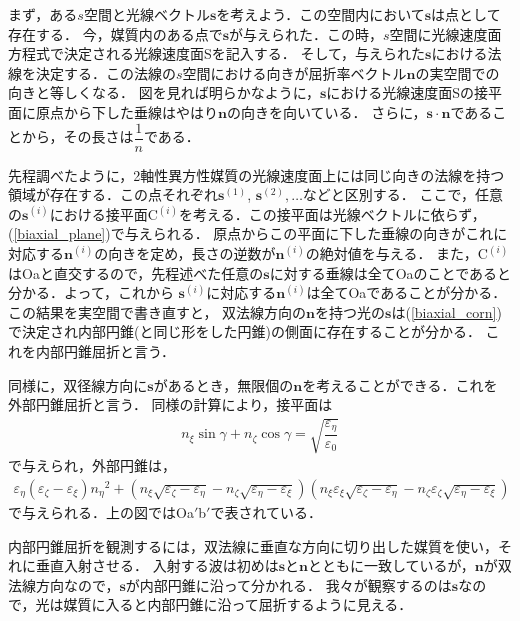 まず，ある$s$空間と光線ベクトル$\boldsymbol{s}$を考えよう．この空間内において$\boldsymbol{s}$は点として存在する．
今，媒質内のある点で$\boldsymbol{s}$が与えられた．この時，$s$空間に光線速度面方程式で決定される光線速度面Sを記入する．
そして，与えられた$\boldsymbol{s}$における法線を決定する．この法線の$s$空間における向きが屈折率ベクトル$\boldsymbol{n}$の実空間での向きと等しくなる．
図を見れば明らかなように，$\boldsymbol{s}$における光線速度面Sの接平面に原点から下した垂線はやはり$\boldsymbol{n}$の向きを向いている．
さらに，$\boldsymbol{s}\cdot\boldsymbol{n}$であることから，その長さは$\dfrac{1}{n}$である．

先程調べたように，2軸性異方性媒質の光線速度面上には同じ向きの法線を持つ領域が存在する．この点それぞれ$\boldsymbol{s}^{(1)}$, $\boldsymbol{s}^{(2)},\ldots$などと区別する．
ここで，任意の$\boldsymbol{s}^{(i)}$における接平面C$^{(i)}$を考える．この接平面は光線ベクトルに依らず，(\ref{biaxial_plane})で与えられる．
原点からこの平面に下した垂線の向きがこれに対応する$\boldsymbol{n}^{(i)}$の向きを定め，長さの逆数が$\boldsymbol{n}^{(i)}$の絶対値を与える．
また，C$^{(i)}$はOaと直交するので，先程述べた任意の$\boldsymbol{s}$に対する垂線は全てOaのことであると分かる．よって，これから
$\boldsymbol{s}^{(i)}$に対応する$\boldsymbol{n}^{(i)}$は全てOaであることが分かる．
この結果を実空間で書き直すと，
双法線方向の$\boldsymbol{n}$を持つ光の$\boldsymbol{s}$は(\ref{biaxial_corn})で決定され内部円錐(と同じ形をした円錐)の側面に存在することが分かる．
これを内部円錐屈折と言う．

同様に，双径線方向に$\boldsymbol{s}$があるとき，無限個の$\boldsymbol{n}$を考えることができる．これを
外部円錐屈折と言う．
同様の計算により，接平面は
\begin{align}
  n_\xi\sin\gamma+n_\zeta\cos\gamma=\sqrt{\dfrac{\varepsilon_\eta}{\varepsilon_0}}
\end{align}
で与えられ，外部円錐は，
\begin{align}
  \varepsilon_\eta(\varepsilon_\zeta-\varepsilon_\xi){n_\eta}^2+\left(n_\xi\sqrt{\varepsilon_\zeta-\varepsilon_\eta}-n_\zeta\sqrt{\varepsilon_\eta-\varepsilon_\xi}\right)\left(n_\xi\varepsilon_\xi\sqrt{\varepsilon_\zeta-\varepsilon_\eta}-n_\zeta\varepsilon_\zeta\sqrt{\varepsilon_\eta-\varepsilon_\xi}\right)
\end{align}
で与えられる．上の図ではOa$'$b$'$で表されている．

内部円錐屈折を観測するには，双法線に垂直な方向に切り出した媒質を使い，それに垂直入射させる．
入射する波は初めは$\boldsymbol{s}$と$\boldsymbol{n}$とともに一致しているが，$\boldsymbol{n}$が双法線方向なので，$\boldsymbol{s}$が内部円錐に沿って分かれる．
我々が観察するのは$\boldsymbol{s}$なので，光は媒質に入ると内部円錐に沿って屈折するように見える．

